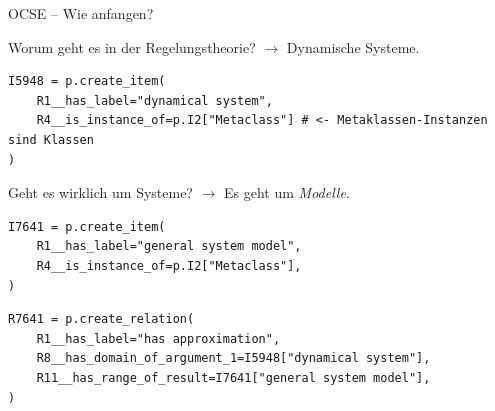 \documentclass[
	ngerman,
	10pt,				%
	aspectratio=169 	%
]{beamer}
\begin{document}
\begin{frame}[t,fragile,label=ocse2]{\large OCSE -- Wie anfangen?}


\vspace{-3mm}
 Worum geht es in der Regelungstheorie? $\rightarrow$ \pause Dynamische Systeme.
\pause
\begin{lstlisting}
I5948 = p.create_item(
    R1__has_label="dynamical system",
    R4__is_instance_of=p.I2["Metaclass"] # <- Metaklassen-Instanzen sind Klassen
)
\end{lstlisting}

\smallskip
Geht es wirklich um Systeme? \pause $\rightarrow$ Es geht um \textit{Modelle}.
\pause
 

\vspace{-1em}
\begin{lstlisting}
I7641 = p.create_item(
    R1__has_label="general system model",
    R4__is_instance_of=p.I2["Metaclass"],
)
\end{lstlisting}

\vspace{-2em}
\pause
\begin{lstlisting}
R7641 = p.create_relation(
    R1__has_label="has approximation",
    R8__has_domain_of_argument_1=I5948["dynamical system"],
    R11__has_range_of_result=I7641["general system model"],
)
\end{lstlisting}


\end{frame}
  
\end{document}
